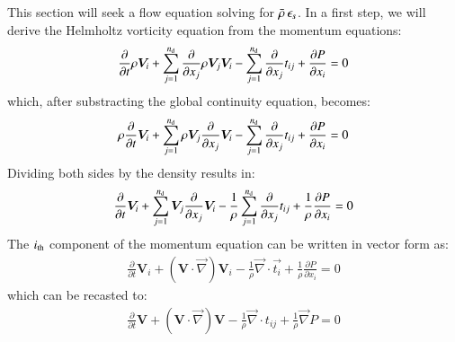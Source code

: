 \documentclass{warpdoc}
\newcommand{\nd}{{{n}_{\rm d}}}
\newcommand{\mfd}{\displaystyle}
\begin{document}
This section will seek a flow equation solving for
$\bar{\rho}\,\epsilon_s$. In a first step,
we will derive the Helmholtz vorticity equation from
the momentum equations:
%
\begin{equation}
 \label{eqn:SDR:momentum1}
 \begin{array}{r}
  \mfd\frac{\partial}{\partial t}  {\rho}  {\bm{V}_i}
      +  \sum_{j=1}^{\nd} \frac{\partial }{\partial x_j}
             {\rho} {\bm{V}_j} {\bm{V}_i}
      - \sum_{j=1}^{\nd} \frac{\partial }{\partial x_j} t_{ij}
      +  \frac{\partial P}{\partial x_i}
      = 0
 \end{array}
\end{equation}
%
which, after substracting the global continuity equation, becomes:
%
\begin{equation}
 \label{eqn:SDR:momentum2}
 \begin{array}{r}
  \mfd {\rho} \frac{\partial}{\partial t}  {\bm{V}_i}
      +  \sum_{j=1}^{\nd} {\rho} {\bm{V}_j} \frac{\partial }{\partial x_j}{\bm{V}_i}
      - \sum_{j=1}^{\nd} \frac{\partial }{\partial x_j} t_{ij}
      +  \frac{\partial P}{\partial x_i}
      = 0
 \end{array}
\end{equation}
%
Dividing both sides by the density results in:
%
\begin{equation}
 \label{eqn:SDR:momentum3}
 \begin{array}{r}
  \mfd \frac{\partial}{\partial t}  {\bm{V}_i}
      +  \sum_{j=1}^{\nd} {\bm{V}_j} \frac{\partial }{\partial x_j}{\bm{V}_i}
      - \frac{1}{\rho}\sum_{j=1}^{\nd} \frac{\partial }{\partial x_j} t_{ij}
      +  \frac{1}{\rho}\frac{\partial P}{\partial x_i}
      = 0
 \end{array}
\end{equation}
%
The $i_{\rm th}$ component of the momentum equation can be written
in vector form as:
%
\begin{equation}
 \label{eqn:SDR:momentum4}
 \begin{array}{r}
  \mfd\frac{\partial}{\partial t} \bm{V}_i
      + 
            \left( \bm{V} \cdot \vec{\nabla} \right) \bm{V}_i
      - \frac{1}{\rho} \vec{\nabla} \cdot \vec{t_i}
      +  \frac{1}{\rho} \frac{\partial P}{\partial x_i}
      = 0
 \end{array}
\end{equation}
%
which can be recasted to:
%
\begin{equation}
 \label{eqn:SDR:momentum5}
 \begin{array}{r}
  \mfd\frac{\partial}{\partial t} \bm{V}
      + 
            \left( \bm{V} \cdot \vec{\nabla} \right) \bm{V}
      - \frac{1}{\rho} \vec{\nabla} \cdot t_{ij}
      +  \frac{1}{\rho} \vec{\nabla} P
      = 0
 \end{array}
\end{equation}
\end{document}
